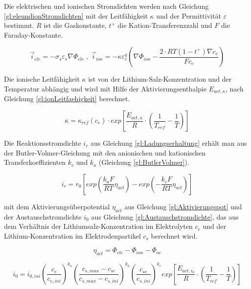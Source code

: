 Die elektrischen und ionischen Stromdichten werden nach Gleichung \ref{gl:eleundionStromdichten} mit der Leitfähigkeit $\kappa$ und der Permittivität $\varepsilon$ bestimmt. $R$ ist die Gaskonstante, $t^{+}$ die Kation-Transferenzzahl und $F$ die Faraday-Konstante.

\begin{equation}
	\vec{i}_{ele} = - \sigma_{s} \varepsilon_{s} \nabla \Phi_{ele} \; , \; \vec{i}_{ion} = - \kappa \varepsilon^{q}_{e} \left( \nabla \Phi_{ion} - \frac{2\cdot RT (1-t^{+})\nabla c_{e}}{F c_{e}} \right) \label{gl:eleundionStromdichten}
\end{equation}

Die ionische Leitfähigkeit $\kappa$ ist von der Lithium-Salz-Konzentration und der Temperatur abhängig und wird mit Hilfe der Aktivierungsenthalpie $E_{act,\kappa}$, nach Gleichung \ref{gl:ionLeitfaehigkeit} berechnet.

\begin{equation}
	\kappa = \kappa_{ref} (c_{e}) \cdot exp \left[ \frac{E_{act,\kappa}}{R} \cdot \left( \frac{1}{T_{ref}} - \frac{1}{T} \right) \right] \label{gl:ionLeitfaehigkeit}
\end{equation}

Die Reaktionsstromdichte $i_{r}$ aus Gleichung \ref{gl:Ladungserhaltung} erhält man aus der Butler-Volmer-Gleichung mit den anionischen und kationischen Transferkoeffizienten $k_{c}$ und $k_{a}$ (Gleichung \ref{gl:ButlerVolmer}).

\begin{equation}
	i_{r} = r_{0} \left[ exp \left( \frac{k_{a} F}{RT} \eta_{act} \right) - exp\left( -\frac{k_{c}F}{RT} \eta_{act} \right) \right] \label{gl:ButlerVolmer}
\end{equation} 

mit dem Aktivierungsüberpotential $\eta_{act}$ aus Gleichung \ref{gl:Aktivierungspot} und der Austauschstromdichte $i_{0}$ aus Gleichung \ref{gl:Austauschstromdichte}, das aus dem Verhältnis der Lithiumsalz-Konzentration im Elektrolyten $c_{e}$ und der Lithium-Konzentration im Elektrodenpartikel $c_{s}$ berechnet wird.

\begin{equation}
	\eta_{act} = \Phi_{ele} - \Phi_{ion} - \Phi_{oc} \label{gl:Aktivierungspot}
\end{equation}

\begin{equation}
	i_{0} = i_{0,ini} \left( \frac{c_{e}}{c_{e,ini}} \right)^{k_{a}} \left( \frac{c_{s,max} - c_{se}}{c_{s,max} - c_{s,ini}}\right)^{k_{a}} \left( \frac{c_{se}}{c_{s,ini}} \right)^{k_{c}} exp\left[ \frac{E_{act,i_{0}}}{R} \cdot \left( \frac{1}{T_{ref}} - \frac{1}{T}\right) \right] \label{gl:Austauschstromdichte}
\end{equation}


